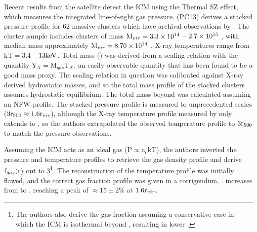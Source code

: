Recent results from the \Planck{} satellite detect the ICM using the
Thermal SZ effect, which measures the integrated line-of-sight gas
pressure. \textbf{\citet{PlanckIntV}} (PC13) derives a stacked pressure
profile for 62 massive clusters which have archival observations by
\XMM. The cluster sample \citep[detailed in][]{PlanckEarlyXI} includes
clusters of mass $\textrm{M\ensuremath{_{vir}}} = 3.3\times 10^{14}$ -- $2.7 \times 10^{15}$ \Msun,
with median mass approximately $\textrm{M\ensuremath{_{vir}}} = 8.70 \times 10^{14}$ \Msun. X-ray
temperatures range from $\textrm{kT} = 3.4$ -- $13 \textrm{keV}$. Total mass
(\Mfive) was derived from a scaling relation with the quantity
$\textrm{Y}_X = \textrm{M}_{gas}\textrm{T}_X$, an easily-observable
quantity that has been found to be a good mass proxy. The scaling
relation in question \citep{Arnaud2010} was calibrated against X-ray
derived hydrostatic masses, and so the total mass profile of the
stacked \Planck{} clusters assumes hydrostatic equilibrium. The total
mass beyond \rfive{} was calculated assuming an NFW profile. The
stacked pressure profile is measured to unprecedented scales ($3\textrm{r\ensuremath{_{500}}}
\approx 1.6\textrm{r\ensuremath{_{vir}}}$), although the X-ray temperature profile measured by
\XMM{} only extends to \rfive{}, so the authors extrapolated the
observed temperature profile to $3\textrm{r\ensuremath{_{500}}}{}$ to match the pressure
observations.

Assuming the ICM acts as an ideal gas ($\textrm{P} \propto
\textrm{n}_\textrm{e}\textrm{kT}$), the authors inverted the pressure
and temperature profiles to retrieve the gas density profile and
derive $\textrm{f\ensuremath{_{gas}}}{}(\textrm{r})$ out to 3\rfive{}\footnote{The authors also
  derive the gas-fraction assuming a conservative case in which the
  ICM is isothermal beyond \rfive{}, resulting in lower \fg{}.}. The
reconstruction of the temperature profile was initially flawed, and
the correct gas fraction profile was given in a corrigendum,
\citet{PlanckIntVb}. \fg{} increases from \rfive{} to \rvir{}
\citep[as predicted by][see \ref{sec:Gas.Extrapolation}]{Rasheed2011},
reaching a peak of $\approx 15\pm2\%$ at $1.6\textrm{r\ensuremath{_{vir}}}{}$.

